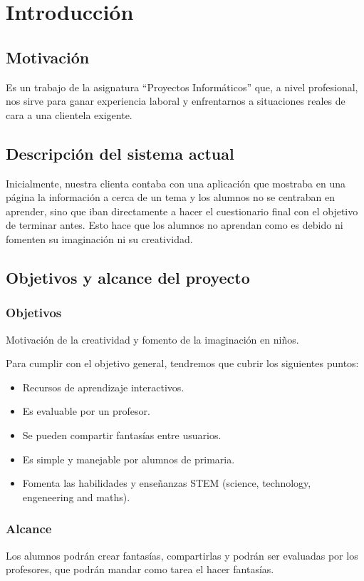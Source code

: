 \chapter{Introducción}
\section{Motivación}
Es un trabajo de la asignatura ``Proyectos Informáticos'' que, a nivel profesional, nos sirve para ganar experiencia laboral y enfrentarnos a situaciones reales de cara a una clientela exigente.

\section{Descripción del sistema actual}
Inicialmente, nuestra clienta contaba con una aplicación que mostraba en una página la información a cerca de un tema y los alumnos no se centraban en aprender, sino que iban directamente a hacer el cuestionario final con el objetivo de terminar antes. Esto hace que los alumnos no aprendan como es debido ni fomenten su imaginación ni su creatividad.

\section{Objetivos y alcance del proyecto}
\subsection{Objetivos}
Motivación de la creatividad y fomento de la imaginación en niños.

Para cumplir con el objetivo general, tendremos que cubrir los siguientes puntos:
\begin{itemize}
	\item Recursos de aprendizaje interactivos.
	\item Es evaluable por un profesor.
	\item Se pueden compartir fantasías entre usuarios.
	\item Es simple y manejable por alumnos de primaria.
	\item Fomenta las habilidades y enseñanzas STEM (science, technology, engeneering and maths).
\end{itemize}

\subsection{Alcance}
Los alumnos podrán crear fantasías, compartirlas y podrán ser evaluadas por los profesores, que podrán mandar como tarea el hacer fantasías.

